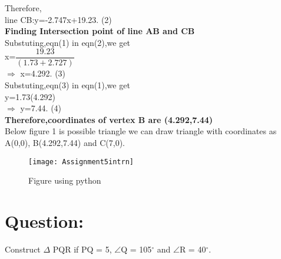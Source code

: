 \documentclass[a4paper,12pt]{article}
\begin{document}
Therefore,\\

\hspace*{0.5cm}line CB:y=-2.747x+19.23.   \hspace*{2.5cm}(2) \\

\pagebreak
\textbf{Finding Intersection point of line AB and CB}\\

Substuting,eqn(1) in eqn(2),we get\\

x=$\dfrac{19.23}{(1.73+2.727)}$\\

$\Rightarrow$ x=4.292.\hspace*{3cm} (3)\\

Substuting,eqn(3) in eqn(1),we get\\

y=1.73(4.292)\\

$\Rightarrow$ y=7.44.\hspace*{3cm} (4)\\

\textbf{Therefore,coordinates of vertex B are (4.292,7.44)}\\

Below figure 1 is possible triangle we can draw triangle with coordinates
\hspace*{0.5cm} as A(0,0), B(4.292,7.44) and C(7,0).\\

\vspace*{1cm} 
 
\begin{figure}[h]
\centering
\texttt{[image: Assignment5intrn]}
\caption{Figure using python}
\end{figure}

\pagebreak

\section*{\small Question:}
Construct $\Delta$ PQR if PQ = 5, $\angle$Q = 105$^{\circ}$ and $\angle$R = 40$^{\circ}$.
\end{document}
